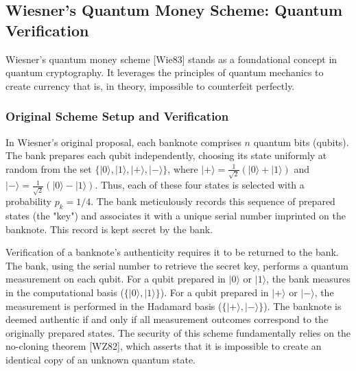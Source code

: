 \documentclass{article} %
\begin{document}
\subsection{Wiesner's Quantum Money Scheme: Quantum Verification}
Wiesner's quantum money scheme [Wie83] stands as a foundational concept in quantum cryptography. It leverages the principles of quantum mechanics to create currency that is, in theory, impossible to counterfeit perfectly.

\subsubsection{Original Scheme Setup and Verification}
In Wiesner's original proposal, each banknote comprises $n$ quantum bits (qubits). The bank prepares each qubit independently, choosing its state uniformly at random from the set $\{|0\rangle, |1\rangle, |+\rangle, |-\rangle\}$, where $|+\rangle = \frac{1}{\sqrt{2}}(|0\rangle + |1\rangle)$ and $|-\rangle = \frac{1}{\sqrt{2}}(|0\rangle - |1\rangle)$. Thus, each of these four states is selected with a probability $p_k = 1/4$. The bank meticulously records this sequence of prepared states (the "key") and associates it with a unique serial number imprinted on the banknote. This record is kept secret by the bank.

Verification of a banknote's authenticity requires it to be returned to the bank. The bank, using the serial number to retrieve the secret key, performs a quantum measurement on each qubit. For a qubit prepared in $|0\rangle$ or $|1\rangle$, the bank measures in the computational basis ($\{|0\rangle, |1\rangle\}$). For a qubit prepared in $|+\rangle$ or $|-\rangle$, the measurement is performed in the Hadamard basis ($\{|+\rangle, |-\rangle\}$). The banknote is deemed authentic if and only if all measurement outcomes correspond to the originally prepared states. The security of this scheme fundamentally relies on the no-cloning theorem [WZ82], which asserts that it is impossible to create an identical copy of an unknown quantum state.

\end{document}
